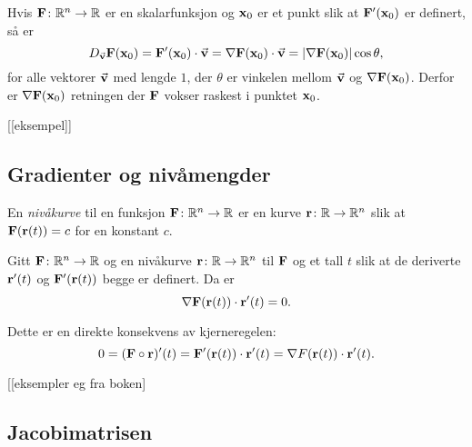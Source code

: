 \begin{teorem}
  Hvis $\mathbf{F}\colon \mathbb{R}^n \to \mathbb{R}$ er en skalarfunksjon og $\mathbf{x}_0$ er et punkt slik
  at $\mathbf{F}'(\mathbf{x}_0)$ er definert, så er
  $$D_{\vec{\mathbf{v}}} \mathbf{F}(\mathbf{x}_0) = \mathbf{F}'(\mathbf{x}_0) \cdot \vec{\mathbf{v}} = \nabla \mathbf{F}(\mathbf{x}_0) \cdot
  \vec{\mathbf{v}} = |\nabla \mathbf{F}(\mathbf{x}_0)| \cos \theta,$$
  for alle vektorer $\vec{\mathbf{v}}$ med lengde $1$, der $\theta$ er vinkelen mellom $\vec{\mathbf{v}}$ og $\nabla \mathbf{F}(\mathbf{x}_0)$.
  Derfor er $\nabla \mathbf{F}(\mathbf{x}_0)$ retningen der $\mathbf{F}$ vokser raskest i punktet $\mathbf{x}_0$.
\end{teorem}
[[eksempel]]

\subsection{Gradienter og nivåmengder}

\begin{definisjon}
  En {\em nivåkurve} til en funksjon $\mathbf{F} \colon \mathbb{R}^n \to \mathbb{R}$ er en kurve
  $\mathbf{r} \colon \mathbb{R} \to \mathbb{R}^n$
  slik at $\mathbf{F}(\mathbf{r}(t)) = c$ for en konstant $c$.
\end{definisjon}
\begin{teorem}
  Gitt $\mathbf{F} \colon \mathbb{R}^n \to \mathbb{R}$ og en nivåkurve $\mathbf{r} \colon \mathbb{R} \to \mathbb{R}^n$
  til $\mathbf{F}$ og et tall $t$ slik at de deriverte  $\mathbf{r}'(t)$ og $\mathbf{F}'(\mathbf{r}(t))$
  begge er definert. Da er 
  $$\nabla \mathbf{F}(\mathbf{r}(t)) \cdot \mathbf{r}'(t) = 0.$$
\end{teorem}
Dette er en direkte konsekvens av kjerneregelen:
\begin{displaymath}
  0 = (\mathbf{F} \circ \mathbf{r})'(t) =
  \mathbf{F}'(\mathbf{r}(t)) \cdot \mathbf{r}'(t) =
  \nabla F(\mathbf{r}(t)) \cdot \mathbf{r}'(t).
\end{displaymath}

[[eksempler eg fra boken]
\subsection{Jacobimatrisen}


